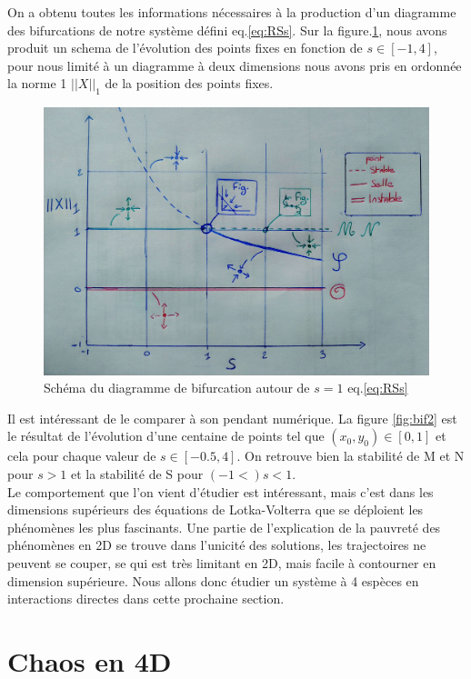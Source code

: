 \documentclass{wsdcr}
\begin{document}
On a obtenu toutes les informations nécessaires à la production d'un diagramme des bifurcations de notre système défini eq.\ref{eq:RSs}. Sur la figure.\ref{fig:dessinlv2}, nous avons produit un schema de l'évolution des points fixes en fonction de $s \in [-1,4]$, pour nous limité à un diagramme à deux dimensions nous avons pris en ordonnée la norme 1 $||X||_1$ de la position des points fixes.
\begin{figure}
    \centering
    \includegraphics[width=\linewidth]{fig/dessin.jpg}
    \caption{Schéma du diagramme de bifurcation autour de $s=1$ eq.\ref{eq:RSs}}
    \label{fig:dessinlv2}
\end{figure}
Il est intéressant de le comparer à son pendant numérique. La figure \ref{fig:bif2} est le résultat de l'évolution d'une centaine de points tel que $(x_0,y_0) \in [0,1]$ et cela pour chaque valeur de $s \in [-0.5,4]$. On retrouve bien la stabilité de M et N pour $s > 1$ et la stabilité de S pour $(-1<)s<1$. \\
Le comportement que l'on vient d'étudier est intéressant, mais c'est dans les dimensions supérieurs des équations de Lotka-Volterra que se déploient les phénomènes les plus fascinants. Une partie de l'explication de la pauvreté des phénomènes en 2D se trouve dans l'unicité des solutions, les trajectoires ne peuvent se couper, se qui est très limitant en 2D, mais facile à contourner en dimension supérieure. Nous allons donc étudier un système à 4 espèces en interactions directes dans cette prochaine section.
\section{Chaos en 4D}
\end{document}
